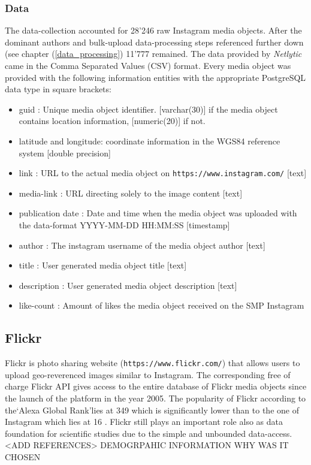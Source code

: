 \subsubsection{Data} \label{instagram_data}
The data-collection accounted for 28\rq246 raw Instagram media objects. After the dominant authors and bulk-upload data-processing steps referenced further down (see chapter (\ref{data_processing}) 11\rq777 remained.
The data provided by \textit{Netlytic} came in the Comma Separated Values (CSV) format. Every media object was provided with the following information entities with the appropriate PostgreSQL data type in square brackets:
\begin{itemize}
    \item guid : Unique media object identifier. [varchar(30)] if the media object contains location information, [numeric(20)] if not.
    \item latitude and longitude: coordinate information in the WGS84 reference system [double precision]
    \item link : URL to the actual media object on \texttt{https://www.instagram.com/} [text]
    \item media-link : URL directing solely to the image content [text]
    \item publication date : Date and time when the media object was uploaded with the data-format YYYY-MM-DD HH:MM:SS [timestamp]
    \item author : The instagram username of the media object author [text]
    \item title : User generated media object title [text]
    \item description : User generated media object description [text] 
    \item like-count : Amount of likes the media object received on the SMP Instagram
\end{itemize}


\subsection{Flickr} \label{flickr}
Flickr is photo sharing website (\texttt{https://www.flickr.com/}) that allows users to upload geo-reverenced images similar to Instagram. The corresponding free of charge Flickr API gives access to the entire database of Flickr media objects since the launch of the platform in the year 2005. The popularity of Flickr according to the\lq Alexa Global Rank\rq lies at 349 \cite{Alexa.com2019AlexaFlickr} which is significantly lower than to the one of Instagram which lies at 16 \cite{Alexa.com2019AlexaInstagram}. Flickr still plays an important role also as data foundation for scientific studies due to the simple and unbounded data-access. <ADD REFERENCES>
DEMOGRPAHIC INFORMATION
WHY WAS IT CHOSEN
